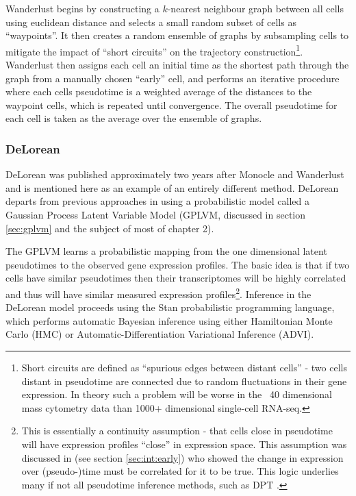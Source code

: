 Wanderlust begins by constructing a $k$-nearest neighbour graph between all cells using euclidean distance and selects a small random subset of cells as ``waypoints''. It then creates a random ensemble of graphs by subsampling cells to mitigate the impact of ``short circuits'' on the trajectory construction\footnote{
Short circuits are defined as ``spurious edges between distant cells'' - two cells distant in pseudotime are connected due to random fluctuations in their gene expression. In theory such a problem will be worse in the ~40 dimensional mass cytometry data than 1000+ dimensional single-cell RNA-seq.
}. Wanderlust then assigns each cell an initial time as the shortest path through the graph from a manually chosen ``early'' cell, and performs an iterative procedure where each cells pseudotime is a weighted average of the distances to the waypoint cells, which is repeated until convergence. The overall pseudotime for each cell is taken as the average over   the ensemble of graphs.

\subsubsection{DeLorean}

DeLorean \cite{Reid2016-yo} was published approximately two years after Monocle and Wanderlust and is mentioned here as an example of an entirely different method. DeLorean departs from previous approaches in using a probabilistic model called a Gaussian Process Latent Variable Model (GPLVM, discussed in section \ref{sec:gplvm} and the subject of most of chapter 2).

The GPLVM learns a probabilistic mapping from the one dimensional latent pseudotimes to the observed gene expression profiles. The basic idea is that if two cells have similar pseudotimes then their transcriptomes will be highly correlated and thus will have similar measured expression profiles\footnote{
This is essentially a continuity assumption - that cells close in pseudotime will have expression profiles ``close'' in expression space. This assumption was discussed in \cite{Gupta2008-fd} (see section \ref{sec:int:early}) who showed the change in expression over (pseudo-)time must be correlated for it to be true. This logic underlies many if not all pseudotime inference methods, such as DPT \cite{haghverdi2016diffusion}.
}. Inference in the DeLorean model proceeds using the Stan probabilistic programming language, which performs automatic Bayesian inference using either Hamiltonian Monte Carlo (HMC) or Automatic-Differentiation Variational Inference (ADVI).

